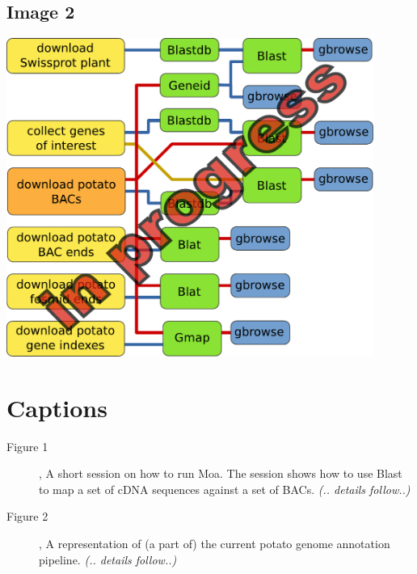 \documentclass[a4paper,11pt,oneside]{article}
\begin{document}
\subsection{Image 2}
\includegraphics[width=0.9\textwidth]{image2_pipeline.pdf}


\section{Captions}

\begin{description}

\item[Figure 1], A short session on how to run Moa. The session shows
  how to use Blast to map a set of cDNA sequences against a set of
  BACs. \textit{(.. details follow..)}
\item[Figure 2], A representation of (a part of) the current potato
genome annotation pipeline. \textit{(.. details follow..)}

\end{description}



\end{document}
